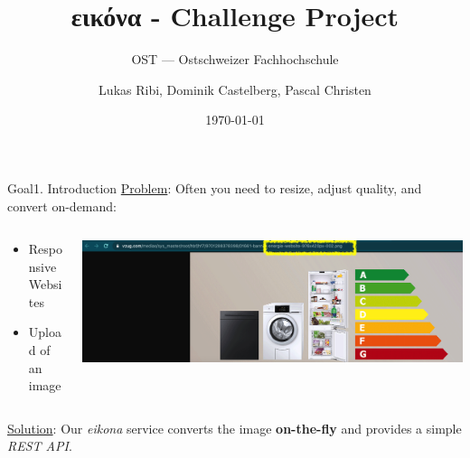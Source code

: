 \documentclass[aspectratio=169,20pt]{beamer}
\title{εικόνα - Challenge Project}
\subtitle{OST — Ostschweizer Fachhochschule}
\date{\today}
\author{Lukas Ribi, Dominik Castelberg, Pascal Christen}
\institute{DS1 - Thomas Bocek }
\begin{document}
\begin{frame}
	\titlepage
\end{frame}

\begin{frame}{Goal}{1. Introduction}
	\underline{Problem}: Often you need to resize, adjust quality, and convert on-demand:
	\vspace{1in}
	\begin{columns}[onlytextwidth,T]
		\begin{column}{.25\linewidth}
			\begin{itemize}
				\item{Responsive Websites}
				\item{Upload of an image}
			\end{itemize}
		\end{column}
		\begin{column}{.65\linewidth}
			\includegraphics[scale=0.55]{vzug}
		\end{column}
	\end{columns}
	\underline{Solution}: Our \textit{eikona} service converts the image \textbf{on-the-fly} and provides a simple \textit{REST API}.
\end{frame}
\end{document}
